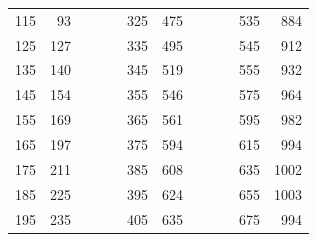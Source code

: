 \begin{enumerate}
\begin{table}[h!]
\begin{tabular}{|r|r|rll|r|r|rll|r|r|}
					115                             & 93                           &  &  &  & 325                            & 475                          &  &  &  & 535                            & 884                          \\ \cline{1-2} \cline{6-7} \cline{11-12} 
					125                             & 127                          &  &  &  & 335                            & 495                          &  &  &  & 545                            & 912                          \\ \cline{1-2} \cline{6-7} \cline{11-12} 
					135                             & 140                          &  &  &  & 345                            & 519                          &  &  &  & 555                            & 932                          \\ \cline{1-2} \cline{6-7} \cline{11-12} 
					145                             & 154                          &  &  &  & 355                            & 546                          &  &  &  & 575                            & 964                          \\ \cline{1-2} \cline{6-7} \cline{11-12} 
					155                             & 169                          &  &  &  & 365                            & 561                          &  &  &  & 595                            & 982                          \\ \cline{1-2} \cline{6-7} \cline{11-12} 
					165                             & 197                          &  &  &  & 375                            & 594                          &  &  &  & 615                            & 994                          \\ \cline{1-2} \cline{6-7} \cline{11-12} 
					175                             & 211                          &  &  &  & 385                            & 608                          &  &  &  & 635                            & 1002                         \\ \cline{1-2} \cline{6-7} \cline{11-12} 
					185                             & 225                          &  &  &  & 395                            & 624                          &  &  &  & 655                            & 1003                         \\ \cline{1-2} \cline{6-7} \cline{11-12} 
					195                             & 235                          &  &  &  & 405                            & 635                          &  &  &  & 675                            & 994                          \\ \cline{1-2} \cline{6-7} \cline{11-12} 

\end{tabular}
\end{table}
\end{enumerate}

